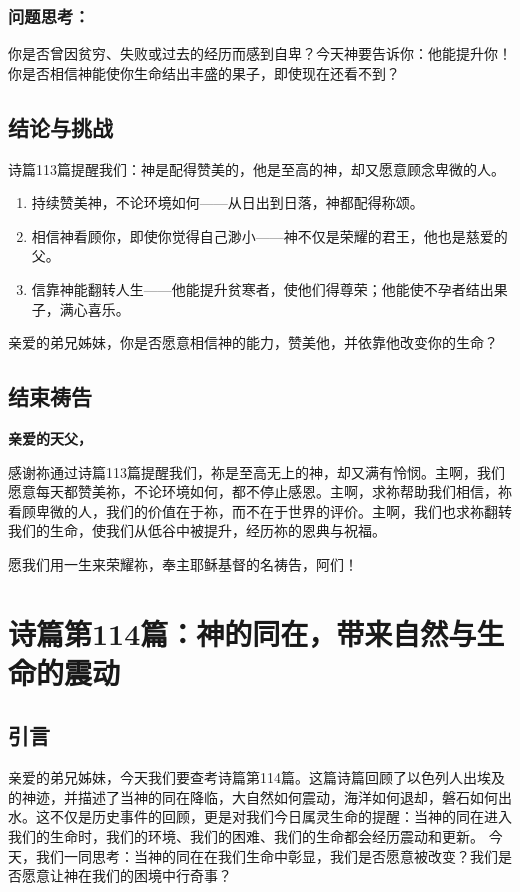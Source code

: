 \documentclass[a4paper, 12pt]{article}
\begin{document}
\subsubsection*{问题思考：}

你是否曾因贫穷、失败或过去的经历而感到自卑？今天神要告诉你：他能提升你！
你是否相信神能使你生命结出丰盛的果子，即使现在还看不到？
\subsection*{结论与挑战}
诗篇113篇提醒我们：神是配得赞美的，他是至高的神，却又愿意顾念卑微的人。
\begin{enumerate}
    \item 持续赞美神，不论环境如何——从日出到日落，神都配得称颂。

    \item 相信神看顾你，即使你觉得自己渺小——神不仅是荣耀的君王，他也是慈爱的父。

    \item 信靠神能翻转人生——他能提升贫寒者，使他们得尊荣；他能使不孕者结出果子，满心喜乐。

\end{enumerate}

亲爱的弟兄姊妹，你是否愿意相信神的能力，赞美他，并依靠他改变你的生命？

\subsection*{结束祷告}
\textbf{亲爱的天父，}

感谢祢通过诗篇113篇提醒我们，祢是至高无上的神，却又满有怜悯。主啊，我们愿意每天都赞美祢，不论环境如何，都不停止感恩。主啊，求祢帮助我们相信，祢看顾卑微的人，我们的价值在于祢，而不在于世界的评价。主啊，我们也求祢翻转我们的生命，使我们从低谷中被提升，经历祢的恩典与祝福。

愿我们用一生来荣耀祢，奉主耶稣基督的名祷告，阿们！
\newpage
\section{诗篇第114篇：神的同在，带来自然与生命的震动}
\subsection*{引言}
亲爱的弟兄姊妹，今天我们要查考诗篇第114篇。这篇诗篇回顾了以色列人出埃及的神迹，并描述了当神的同在降临，大自然如何震动，海洋如何退却，磐石如何出水。这不仅是历史事件的回顾，更是对我们今日属灵生命的提醒：当神的同在进入我们的生命时，我们的环境、我们的困难、我们的生命都会经历震动和更新。
今天，我们一同思考：当神的同在在我们生命中彰显，我们是否愿意被改变？我们是否愿意让神在我们的困境中行奇事？
\end{document}
